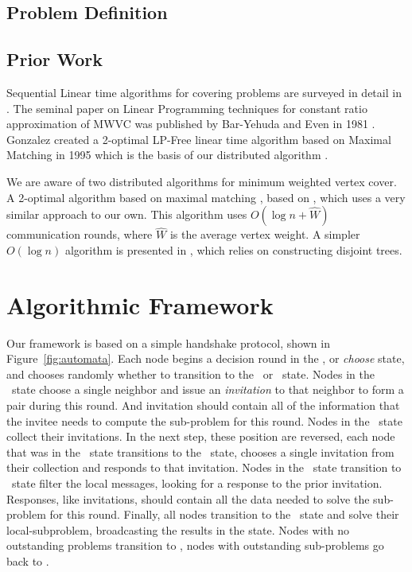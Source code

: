 \documentclass[article, 10pt, letter]{IEEEtran}
\begin{document}
\subsection{Problem Definition}

\subsection{Prior Work}

Sequential Linear time algorithms for covering problems are surveyed in detail in \cite{254190}. The seminal paper on Linear Programming techniques for constant ratio approximation of MWVC was published by Bar-Yehuda and Even in 1981 \cite{Bar-Yehuda:1981lr}. Gonzalez created a 2-optimal LP-Free linear time algorithm based on Maximal Matching in 1995 which is the basis of our distributed algorithm \cite{Gonzalez1995129}. 

We are aware of two distributed algorithms for minimum weighted vertex cover. A 2-optimal algorithm based on maximal matching \cite{1435381}, based on \cite{Israel:1986:FSR:5361.5365}, which uses a very similar approach to our own. This algorithm uses $O(\log n + \hat{W})$ communication rounds, where $\hat{W}$ is the average vertex weight. A simpler $O(\log n)$ algorithm is presented in \cite{1582746}, which relies on constructing disjoint trees.

\section{Algorithmic Framework}

Our framework is based on a simple handshake protocol, shown in Figure~\ref{fig:automata}. Each node begins a decision round in the \cCd, or {\em choose} state, and chooses randomly whether to transition to the \cId\ or \cLd\ state. Nodes in the \cId\ state choose a single neighbor and issue an {\em invitation} to that neighbor to form a pair during this round. And invitation should contain all of the information that the invitee needs to compute the sub-problem for this round. Nodes in the \cLd\ state collect their invitations. In the next step, these position are reversed, each node that was in the \cLd\ state transitions to the \cRd\ state, chooses a single invitation from their collection and responds to that invitation. Nodes in the \cId\ state transition to \cWd\ state filter the local messages, looking for a response to the prior invitation. Responses, like invitations, should contain all the data needed to solve the sub-problem for this round. Finally, all nodes transition to the \cUd\ state and solve their local-subproblem, broadcasting the results in the \cEd state. Nodes with no outstanding problems transition to \cDd, nodes with outstanding sub-problems go back to \cCd.
\end{document}
